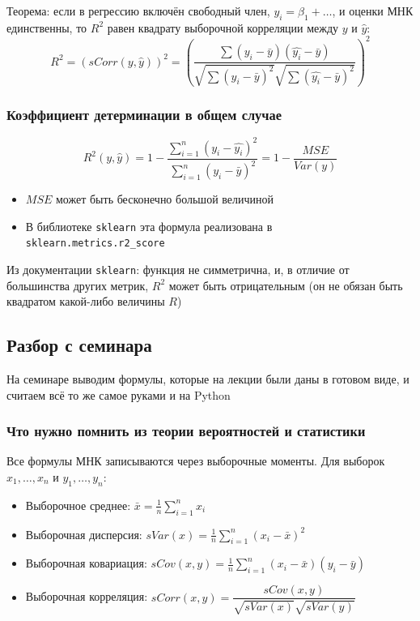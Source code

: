 \documentclass[12pt,a4paper]{article}
\numberwithin{equation}{section}
\theoremstyle{plain}
\theoremstyle{definition}
\theoremstyle{remark}
\begin{document}
Теорема: если в регрессию включён свободный член, $y_i = \beta_1 + \dots$, и оценки МНК единственны, то $R^2$ равен квадрату выборочной корреляции между $y$ и $\hat{y}$:
$$
    R^2 = \left(sCorr\left(y, \hat{y}\right)\right)^2 = \left(\frac{\sum \left(y_i - \bar{y}\right)\left(\hat{y_i} - \bar{y}\right)}{\sqrt{\sum \left(y_i - \bar{y}\right)^2} \sqrt{\sum \left(\hat{y_i} - \bar{y}\right)^2}}\right)^2
$$

\subsubsection{Коэффициент детерминации в общем случае}

$$
    R^2 \left(y, \hat{y}\right) = 1 - \frac{\sum_{i = 1}^n \left(y_i - \hat{y_i}\right)^2}{\sum_{i = 1}^n \left(y_i - \bar{y}\right)^2} = 1 - \frac{MSE}{Var(y)}
$$

\begin{itemize}
    \item $MSE$ может быть бесконечно большой величиной
    \item В библиотеке \texttt{sklearn} эта формула реализована в \texttt{sklearn.metrics.r2\_score}
\end{itemize}

Из документации \texttt{sklearn}: функция не симметрична, и, в отличие от большинства других метрик, $R^2$ может быть отрицательным (он не обязан быть квадратом какой-либо величины $R$)

\subsection{Разбор с семинара}

На семинаре выводим формулы, которые на лекции были даны в готовом виде, и считаем всё то же самое руками и на Python

\subsubsection{Что нужно помнить из теории вероятностей и статистики}

Все формулы МНК записываются через выборочные моменты. Для выборок $x_1, \dots, x_n$ и $y_1, \dots, y_n$:

\begin{itemize}
    \item Выборочное среднее: $\bar{x} = \frac{1}{n}\sum_{i = 1}^n x_i$
    \item Выборочная дисперсия: $sVar(x) = \frac{1}{n}\sum_{i = 1}^n \left(x_i - \bar{x}\right)^2$
    \item Выборочная ковариация: $sCov(x, y) = \frac{1}{n}\sum_{i = 1}^n \left(x_i - \bar{x}\right)\left(y_i - \bar{y}\right)$
    \item Выборочная корреляция: $sCorr(x, y) = \dfrac{sCov(x, y)}{\sqrt{sVar(x)}\sqrt{sVar(y)}}$
\end{itemize}
\end{document}
